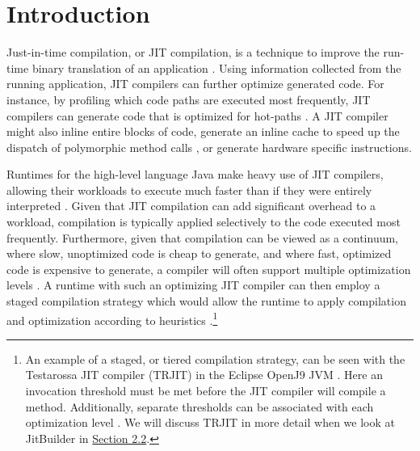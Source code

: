 \section{Introduction}
\label{sec:introduction}
Just-in-time compilation, or JIT compilation, is a technique to improve the run-time binary translation of an application \cite{Aycock:2003:BHJ:857076.857077}.
Using information collected from the running application, JIT compilers can further optimize generated code.
For instance, by profiling which code paths are executed most frequently, JIT compilers can generate code that is optimized for hot-paths \cite{Smith:2005:VMV:1204009}.
A JIT compiler might also inline entire blocks of code, generate an inline cache to speed up the dispatch of polymorphic method calls \cite{picPaper}, or generate hardware specific instructions.

Runtimes for the high-level language Java make heavy use of JIT compilers, allowing their workloads to execute much faster than if they were entirely interpreted \cite{HiPerfJava}.
Given that JIT compilation can add significant overhead to a workload, compilation is typically applied selectively to the code executed most frequently.
Furthermore, given that compilation can be viewed as a continuum, where slow, unoptimized code is cheap to generate, and where fast, optimized code is expensive to generate, a compiler will often support multiple optimization levels \cite{Smith:2005:VMV:1204009}.
A runtime with such an optimizing JIT compiler can then employ a staged compilation strategy which would allow the runtime to apply compilation and optimization according to heuristics \cite{dynamo}.\footnote{
    An example of a staged, or tiered compilation strategy, can be seen with the Testarossa JIT compiler (TRJIT) in the Eclipse OpenJ9 JVM \cite{eclipseOMR,TRJITOptimize}.
    Here an invocation threshold must be met before the JIT compiler will compile a method.
    Additionally, separate thresholds can be associated with each optimization level \cite{TRJitLevels}.
    We will discuss TRJIT in more detail when we look at JitBuilder in \hyperref[sec:jitbuilder]{Section 2.2}.}


